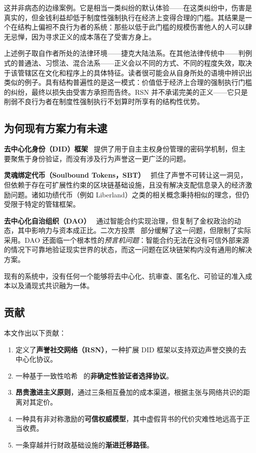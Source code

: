 \documentclass[11pt,a4paper,twocolumn]{article}
\begin{document}
这并非病态的边缘案例。它是相当一类纠纷的默认体验——在这类纠纷中，伤害是真实的，但金钱利益却低于制度性强制执行在经济上变得合理的门槛。其结果是一个在结构上偏袒不良行为者的系统：那些以低于此门槛的规模伤害他人的人可以肆无忌惮，因为寻求正义的成本落在了受害方身上。

上述例子取自作者所处的法律环境——捷克大陆法系。在其他法律传统中——判例式的普通法、习惯法、混合法系——正义会以不同的方式、不同的程度失效，取决于该管辖区在文化和程序上的具体特征。读者很可能会从自身所处的语境中辨识出类似的例子。具有结构普遍性的是这一模式：价值低于经济上合理的强制执行门槛的纠纷，最终以损失由受害方承担而告终。RSN 并不承诺完美的正义——它只是削弱不良行为者在制度性强制执行不划算时所享有的结构性优势。

\subsection{为何现有方案力有未逮}

\textbf{去中心化身份（DID）框架}~\cite{did2022} 提供了用于自主主权身份管理的密码学机制，但主要聚焦于身份验证，而没有涉及行为声誉这一更广泛的问题。

\textbf{灵魂绑定代币（Soulbound Tokens，SBT）}~\cite{weyl2022} 抓住了声誉不可转让这一洞见，但依赖于存在可扩展性约束的区块链基础设施，且没有解决支配信息录入的经济激励问题。诸如功绩代币（例如 Liberland）之类的相关概念秉持相似的理念，但仍受限于特定的管辖框架。

\textbf{去中心化自治组织（DAO）}~\cite{buterin2014} 通过智能合约实现治理，但复制了金权政治的动态，其中影响力与资本成正比。二次方投票~\cite{buterin2019} 部分缓解了这一问题，但限制了实际采用。DAO 还面临一个根本性的\emph{预言机问题}：智能合约无法在没有可信外部来源的情况下可靠地验证现实世界的状态，而这一问题在区块链架构内没有通用的解决方案。

现有的系统中，没有任何一个能够将去中心化、抗审查、匿名化、可验证的准入成本以及涌现式共识融为一体。

\subsection{贡献}

本文作出以下贡献：
\begin{enumerate}[nosep]
\item 定义了\textbf{声誉社交网络（RSN）}，一种扩展 DID 框架以支持双边声誉交换的去中心化协议。
\item 一种基于一致性哈希~\cite{karger1997} 的\textbf{非确定性验证者选择协议}。
\item \textbf{昂贵激进主义原则}，通过三条相互叠加的成本渠道，根据主张与网络共识的距离对其定价。
\item 一种具有非对称激励的\textbf{可信权威模型}，其中虚假背书的代价灾难性地远高于正当收费。
\item 一条穿越并行财政基础设施的\textbf{渐进迁移路径}。
\end{enumerate}
\end{document}
